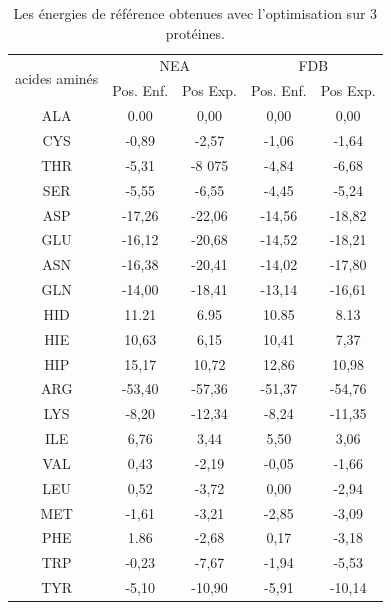     \begin{table}[!htbp]
      \centering
      \caption{Les énergies de référence obtenues avec l'optimisation sur 3 protéines.}
      \begin{tabular}{ccc|cc}

        \toprule
        \multirow{2}{*}{acides aminés}  & \multicolumn{2}{c|}{NEA} & \multicolumn{2}{c}{FDB} \\
        \cmidrule{2-5}
         & Pos. Enf. & Pos Exp. & Pos. Enf. & Pos Exp. \\
        \cmidrule{1-5}

        ALA &   0.00     &  0,00    &   0,00  &   0,00       \\
        CYS &  -0,89     &  -2,57   &  -1,06  &   -1,64      \\
        THR &  -5,31     &  -8 075  &  -4,84  &   -6,68      \\
        SER &  -5,55     &  -6,55   &  -4,45  &   -5,24      \\
        ASP &  -17,26    &  -22,06  &  -14,56 &   -18,82     \\
        GLU &  -16,12    &  -20,68  &  -14,52 &   -18,21     \\
        ASN &  -16,38    &  -20,41  &  -14,02 &   -17,80     \\
        GLN &  -14,00    &  -18,41  &  -13,14 &   -16,61     \\
        HID &   11.21    &  6.95    &  10.85  &   8.13       \\
        HIE &   10,63    &  6,15    &  10,41  &   7,37       \\
        HIP &   15,17    &  10,72   &  12,86  &   10,98      \\
        ARG &  -53,40    &  -57,36  &  -51,37 &   -54,76     \\
        LYS &  -8,20     &  -12,34  &  -8,24  &   -11,35     \\
        ILE &   6,76     &  3,44    &  5,50   &   3,06       \\
        VAL &   0,43     &  -2,19   &  -0,05  &   -1,66      \\
        LEU &   0,52     &  -3,72   &  0,00   &   -2,94      \\
        MET &  -1,61     &  -3,21   &  -2,85  &   -3,09      \\
        PHE &   1.86     &  -2,68   &  0,17   &   -3,18      \\
        TRP &  -0,23     &  -7,67   &  -1,94  &   -5,53      \\
        TYR &  -5,10     &  -10,90  &  -5,91  &   -10,14     \\

        \bottomrule

      \end{tabular}      

\label{tab:RefEner3prot}      
    \end{table}

